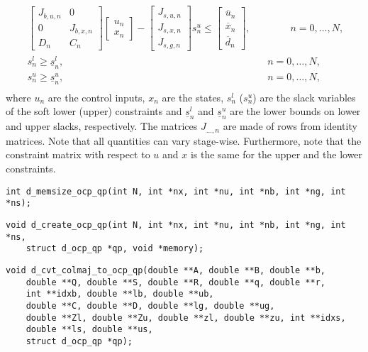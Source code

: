 \documentclass[a4paper]{report}
\begin{document}
\begin{align*}
& \quad \begin{bmatrix} J_{b,u,n} & 0 \\ 0 & J_{b,x,n} \\ D_n & C_n \end{bmatrix} \begin{bmatrix} u_n \\ x_n \end{bmatrix} - \begin{bmatrix} J_{s,u,n} \\ J_{s,x,n} \\ J_{s,g,n} \end{bmatrix} s^u_n \leq \begin{bmatrix} \overline u_n \\ \overline x_n \\ \overline d_n \end{bmatrix} , \qquad \qquad n=0,\dots,N, & & \\
& \quad s^l_n\geq \underline{s}^l_n, \qquad \qquad \qquad \qquad \qquad \qquad \qquad \qquad \qquad \qquad \,\,\,  n=0,\dots,N, & &\\
& \quad s^u_n\geq \underline{s}^u_n, \qquad \qquad \qquad \qquad \qquad \qquad \qquad \qquad \qquad \qquad \,\,\,  n=0,\dots,N, & &\\
\end{align*}
where $u_n$ are the control inputs, $x_n$ are the states, $s^l_n$ ($s^u_n$) are the slack variables of the soft lower (upper) constraints
and $\underline{s}^l_n$ and $\underline{s}^u_n$ are the lower bounds on lower and upper slacks, respectively.
The matrices $J_{\dots,n}$ are made of rows from identity matrices.
Note that all quantities can vary stage-wise.
Furthermore, note that the constraint matrix with respect to $u$ and $x$ is the same for the upper and the lower constraints.

\begin{verbatim}
int d_memsize_ocp_qp(int N, int *nx, int *nu, int *nb, int *ng, int *ns);
\end{verbatim}

\begin{verbatim}
void d_create_ocp_qp(int N, int *nx, int *nu, int *nb, int *ng, int *ns, 
    struct d_ocp_qp *qp, void *memory);
\end{verbatim}

\begin{verbatim}
void d_cvt_colmaj_to_ocp_qp(double **A, double **B, double **b, 
    double **Q, double **S, double **R, double **q, double **r, 
    int **idxb, double **lb, double **ub, 
    double **C, double **D, double **lg, double **ug, 
    double **Zl, double **Zu, double **zl, double **zu, int **idxs, 
    double **ls, double **us,
    struct d_ocp_qp *qp);
\end{verbatim}
\end{document}
